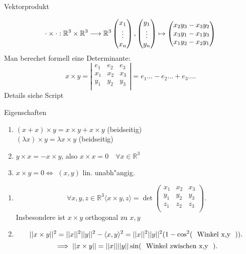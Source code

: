 \documentclass[class=article, crop=false]{standalone}
\begin{document}
\begin{zettel}{Vektorprodukt}
\begin{flashcard}[]{}
	\[
		\cdot \times \cdot  : \mathbb{R}^3 \times \mathbb{R}^3 \longrightarrow \mathbb{R}^3\\ \begin{pmatrix}x_1\\ \vdots \\x_n\end{pmatrix}, \begin{pmatrix}y_1\\ \vdots \\ y_n\end{pmatrix} \mapsto \begin{pmatrix}
			x_2 y_3 - x_3 y_2 \\
			x_3 y_1 - x_1 y_3 \\
			x_1 y_2 - x_2 y_1 \\
		\end{pmatrix}
	\]
	Man berechet formell eine Determinante:
	\[
		x \times y = \left|\begin{matrix}
			e_1 & e_2 & e_3 \\
			x_1 & x_2 & x_3 \\
			y_1 & y_2 & y_3 \\
		\end{matrix}\right| = e_1 \dots - e_2 \dots + e_3 \dots
	.\]
	Details siehe Script
\end{flashcard}

\begin{remark}
	Eigenschaften
	\begin{enumerate}
		\item $(x + x )\times y =  x \times  y +  x \times y$ (beidseitig)\\

		      $(\lambda x )\times y =  \lambda  x \times y$ (beidseitig)
		\item $y \times  x =  -  x \times y$, also $x \times x = 0 \quad \forall x \in  \mathbb{R}^3 $
		\item $x \times y = 0 \iff $ $(x,y)$ lin. unabh"angig.
	\end{enumerate}
\end{remark}
\begin{lemma}[4.1]
	\begin{enumerate}
		\item
		      \[
			      \forall x,y,z \in  \mathbb{R}^3  \langle x \times  y, z\rangle =  \det \begin{pmatrix}
				      x_1 & x_2 & x_3 \\
				      y_1 & y_2 & y_3 \\
				      z_1 & z_2 & z_3 \\
			      \end{pmatrix}
		      .\]
		      Insbesondere ist $x \times y$ orthogonal zu $x,y$
		\item
		      \[
			      ||x \times y||^2  = ||x||^2 ||y||^2 - \langle x,y\rangle ^2 = ||x||^2 ||y||^2 (1 - \cos^2( \tx{ Winkel x,y } ))
		      .\]
		      \[
			      \implies ||x \times y|| =  ||x|| ||y|| \sin( \tx{ Winkel zwischen x,y } )
		      .\]


\end{enumerate}
\end{lemma}
\end{zettel}
\end{document}
